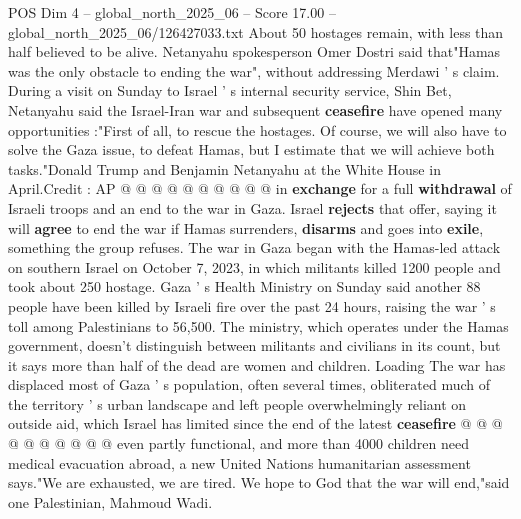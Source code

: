 \begin{textsample}{POS Dim 4 – global\_north\_2025\_06 – Score 17.00 – global\_north\_2025\_06/126427033.txt}
About 50 hostages remain, with less than half believed to be alive.
Netanyahu spokesperson Omer Dostri said that"Hamas was the only obstacle to ending the war", without addressing Merdawi ' s claim.
During a visit on Sunday to Israel ' s internal security service, Shin Bet, Netanyahu said the Israel-Iran war and subsequent \textbf{ceasefire} have opened many opportunities :"First of all, to rescue the hostages.
Of course, we will also have to solve the Gaza issue, to defeat Hamas, but I estimate that we will achieve both tasks."Donald Trump and Benjamin Netanyahu at the White House in April.Credit : AP @ @ @ @ @ @ @ @ @ @ in \textbf{exchange} for a full \textbf{withdrawal} of Israeli troops and an end to the war in Gaza.
Israel \textbf{rejects} that offer, saying it will \textbf{agree} to end the war if Hamas surrenders, \textbf{disarms} and goes into \textbf{exile}, something the group refuses.
The war in Gaza began with the Hamas-led attack on southern Israel on October 7, 2023, in which militants killed 1200 people and took about 250 hostage.
Gaza ' s Health Ministry on Sunday said another 88 people have been killed by Israeli fire over the past 24 hours, raising the war ' s toll among Palestinians to 56,500.
The ministry, which operates under the Hamas government, doesn't distinguish between militants and civilians in its count, but it says more than half of the dead are women and children.
Loading The war has displaced most of Gaza ' s population, often several times, obliterated much of the territory ' s urban landscape and left people overwhelmingly reliant on outside aid, which Israel has limited since the end of the latest \textbf{ceasefire} @ @ @ @ @ @ @ @ @ @ even partly functional, and more than 4000 children need medical evacuation abroad, a new United Nations humanitarian assessment says."We are exhausted, we are tired.
We hope to God that the war will end,"said one Palestinian, Mahmoud Wadi.

\end{textsample}
